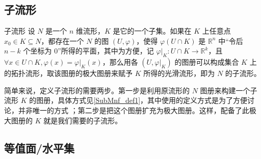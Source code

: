 

\begin{issues}
\issueDraft
\end{issues}


\subsection{子流形}

\begin{definition}{子流形}\label{SubMnf_def1}
设 $N$ 是一个 $n$ 维流形，$K$ 是它的一个子集。如果在 $K$ 上任意点 $x_0\in K\subseteq N$，都存在一个 $N$ 的图 $(U, \varphi)$，使得 $\varphi (U\cap K)$ 是 $\mathbb{R}^n$ 中“令后 $n-k$ 个坐标为 $0$”所得的平面，其中为方便，记 $\varphi|_K:U\cap K\rightarrow\mathbb{R}^k$，且 $\forall x\in U\cap K, \varphi(x)=\varphi|_K(x)$，那么用各 $(U, \varphi|_K)$ 的图册可以构成集合 $K$ 上的拓扑流形，取该图册的极大图册来赋予 $K$ 所得的光滑流形，即为 $N$ 的子流形。
\end{definition}

简单来说，定义子流形的需要两步。第一步是利用原流形的 $N$ 图册来构建一个子流形 $K$ 的图册，具体方式见\autoref{SubMnf_def1}，其中使用的定义方式是为了方便讨论，并非唯一的方式 ；第二步是把这个图册扩充为极大图册。这样，配备了此极大图册的 $K$ 就是我们需要的子流形。


\subsection{等值面/水平集}%
